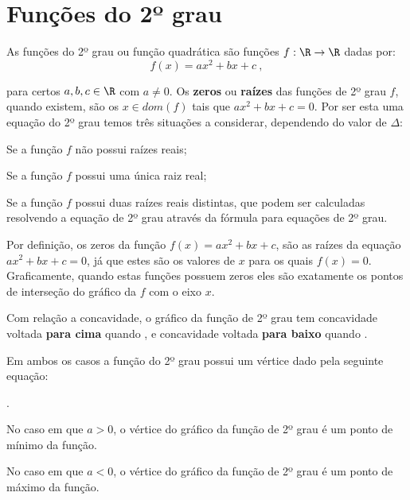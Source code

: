 \section{Funções do 2º grau}
As funções do 2º grau ou função quadrática são funções $f: \R \rightarrow \R$ dadas por:
\begin{equation}
f(x)= ax^2 + bx + c \ ,
\end{equation}

  para certos $a, b, c \in \R$ com $a \neq 0$. Os \textbf{zeros} ou \textbf{raízes} das funções de 2º grau $f$, quando existem, são os $x \in dom(f)$ tais que $ax^2+bx+c=0$. Por ser esta uma equação do 2º grau temos três situações a considerar, dependendo do valor de $\Delta$:
 

 Se  a função $f$ não possui raízes reais;

 Se  a função $f$ possui uma única raiz real;

 Se  a função $f$ possui duas raízes reais distintas, que podem ser calculadas resolvendo a equação de 2º grau através da fórmula para equações de 2º grau.

 Por definição, os zeros da função $f(x)= ax^2+bx+c$, são as raízes da equação $ax^2+bx+c=0$, já que estes são os valores de $x$ para os quais $f(x)=0$. Graficamente, quando estas funções possuem zeros eles são exatamente os pontos de interseção do gráfico da $f$ com o eixo $x$.

 Com relação a concavidade, o gráfico da função de 2º grau tem concavidade voltada \textbf{para cima} quando , e concavidade voltada \textbf{para baixo} quando .

 Em ambos os casos a função do 2º grau possui um vértice dado pela seguinte equação:

 .

 No caso em que $a > 0$, o vértice do gráfico da função de 2º grau é um ponto de mínimo da função.

 No caso em que $a < 0$, o vértice do gráfico da função de 2º grau é um ponto de máximo da função.
 
